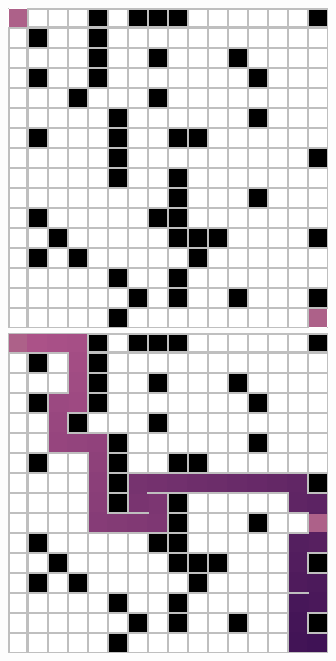 \documentclass[letter]{article}
\begin{document}
\begin{questions}
	\begin{figure}
		\includegraphics[width=\linewidth]{../pics/16/maze.png}
		\caption{}\label{fig:maze}
		\endminipage\hfill
		\includegraphics[width=\linewidth]{../pics/16/DFS distinctFringe 43 43 43.png}

\end{figure}
\end{questions}
\end{document}
